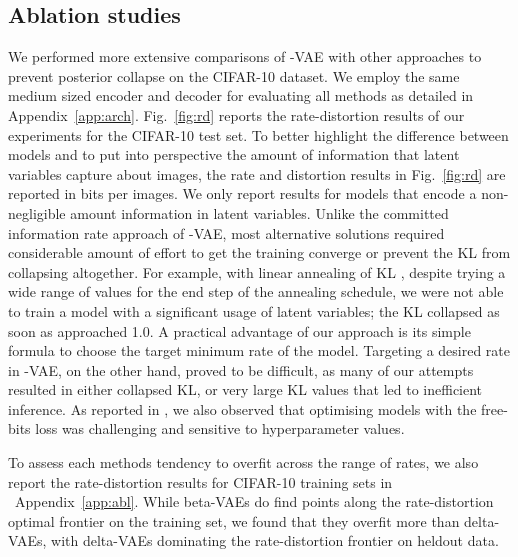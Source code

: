 \documentclass{article} \usepackage{iclr2019_conference,times}
\def\figref#1{figure~\ref{#1}}
\renewcommand{\figref}[1]{Fig.~\ref{#1}}
\newcommand{\aref}[1]{Appendix~\ref{#1}}
\begin{document}
\subsection{Ablation studies}\label{sec:ablation}
We performed more extensive comparisons of -VAE with other approaches to prevent posterior collapse on the CIFAR-10 dataset. We employ the same medium sized encoder and decoder for evaluating all methods as detailed in \aref{app:arch}.
\figref{fig:rd} reports the rate-distortion results of our experiments for the CIFAR-10 test set. To better highlight the difference between models and to put into perspective the amount of information that latent variables capture about images, the rate and distortion results in 
\figref{fig:rd} are reported in bits per images. We only report results for models that encode a non-negligible amount information in latent variables. Unlike the committed information rate approach of -VAE, most alternative solutions required considerable amount of effort to get the training converge or prevent the KL from collapsing altogether. For example, with linear annealing of KL \citep{Bowman2015}, despite trying a wide range of values for the end step of the annealing schedule, we were not able to train a model with a significant usage of latent variables; the KL collapsed as soon as  approached 1.0.
A practical advantage of our approach is its simple formula to choose the target minimum rate of the model. Targeting a desired rate in -VAE, on the other hand, proved to be difficult, as many of our attempts resulted in either collapsed KL, or very large KL values that led to inefficient inference. As reported in \cite{VLAE}, we also observed that optimising models with the free-bits loss was challenging and sensitive to hyperparameter values.
\par
To assess each methods tendency to overfit across the range of rates, we also report the rate-distortion results for CIFAR-10 training sets in ~\aref{app:abl}. While beta-VAEs do find points along the rate-distortion optimal frontier on the training set, we found that they overfit more than delta-VAEs, with delta-VAEs dominating the rate-distortion frontier on heldout data.
\end{document}
